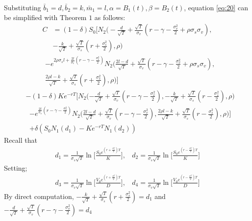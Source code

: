 \documentclass[pdf]{beamer}
\begin{document}
\begin{frame}[allowframebreaks]
Substituting $\bar{b}_{1} = d, \bar{b}_{2} = k, \bar{m}_{1} = l,\alpha = B_{1}(t), \beta =B_{2}(t)$, equation \eqref{eq:20} can be simplified with Theorem $1$ as follows:
\begin{equation}
\label{eq:33}
\begin{aligned} 
C &=(1-\delta) S_{0}\bigg[ N_{2}\bigg(-\frac{d}{\sqrt{T}}+\frac{\sqrt{T}}{\sigma_{v}}(r-\gamma-\frac{\sigma_{v}^{2}}{2}+\rho \sigma_{s} \sigma_{v}),\\
&-\frac{k}{\sqrt{T}}+\frac{\sqrt{T}}{\sigma_{s}}(r+\frac{\sigma_{s}^{2}}{2}), \rho \bigg)
\end{aligned}
\end{equation}
$$
\begin{aligned}
&- e^{2 \rho \sigma_{s} l+\frac{2 l}{\sigma_{v}}(r-\gamma-\frac{\sigma_{v}^{2}}{2})} N_{2}\bigg(\frac{2 l-d}{\sqrt{T}}+\frac{\sqrt{T}}{\sigma_{v}}(r-\gamma-\frac{\sigma_{v}^{2}}{2}+\rho \sigma_{s} \sigma_{v}),\\
& \frac{2 \rho l-k}{\sqrt{T}}+\frac{\sqrt{T}}{\sigma_{s}}(r+\frac{\sigma_{s}^{2}}{2}), \rho \bigg)\bigg]
\end{aligned}
$$
\begin{equation}
\label{eq:34}
\begin{aligned}
&- (1-\delta) K e^{-r T} \bigg[N_{2}(-\frac{d}{\sqrt{T}}+\frac{\sqrt{T}}{\sigma_{v}}(r-\gamma-\frac{\sigma_{v}^{2}}{2}),-\frac{k}{\sqrt{T}}+\frac{\sqrt{T}}{\sigma_{s}}(r-\frac{\sigma_{s}^{2}}{2}), \rho \bigg)
\end{aligned}
\end{equation}
$$
\begin{aligned}
&- e^{\frac{2 l}{\sigma_{v}}(r-\gamma-\frac{\sigma_{v}^{2}}{2})} N_{2}\bigg(\frac{2 l-d}{\sqrt{T}}+\frac{\sqrt{T}}{\sigma_{v}}(r-\gamma-\frac{\sigma_{v}^{2}}{2}), \frac{2 \rho l-k}{\sqrt{T}}+\frac{\sqrt{T}}{\sigma_{s}}(r-\frac{\sigma_{s}^{2}}{2}), \rho \bigg)\bigg]\\
&+ \delta (S_{0} N_{1} (d_{1})-K e^{-r T} N_{1}(d_{2}))
\end{aligned}
$$
Recall that
$$
\begin{aligned}
d_{1} = \frac{1}{\sigma_{s}\sqrt{T}}\ln \bigg[\frac{S_{0}e^{(r + \frac{\sigma_{s}^{2}}{2})T}}{K}\bigg],~~~~
d_{2} = \frac{1}{\sigma_{s}\sqrt{T}}\ln \bigg[\frac{S_{0}e^{(r - \frac{\sigma_{s}^{2}}{2})T}}{K}\bigg]
\end{aligned}
$$
Setting;
$$
\begin{aligned}
d_{3} = \frac{1}{\sigma_{v}\sqrt{T}}\ln \bigg[\frac{V_{0}e^{(r + \frac{\sigma_{v}^{2}}{2})T}}{D}\bigg],~~~~
d_{4} = \frac{1}{\sigma_{v}\sqrt{T}}\ln \bigg[\frac{V_{0}e^{(r - \frac{\sigma_{v}^{2}}{2})T}}{D}\bigg]
\end{aligned}
$$
By direct computation, $-\frac{k}{\sqrt{T}}+\frac{\sqrt{T}}{\sigma_{s}}(r+\frac{\sigma_{s}^{2}}{2})= d_{1}$ and $-\frac{d}{\sqrt{T}}+\frac{\sqrt{T}}{\sigma_{v}}(r-\gamma-\frac{\sigma_{v}^{2}}{2})=d_{4}$
\end{frame}
\end{document}
